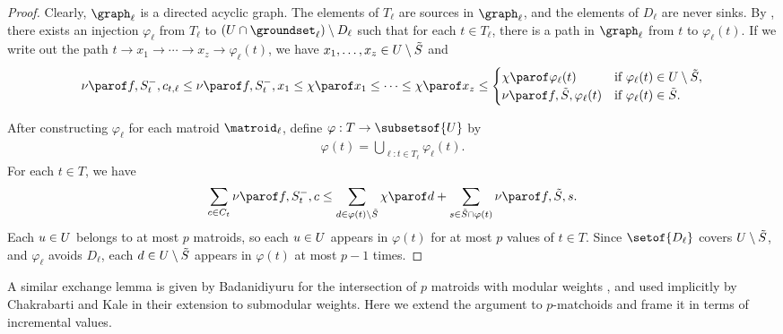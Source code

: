 \documentclass[oneside,letterpaper]{scrartcl} \usepackage{macros}
\newcommand{\mindex}{\ell}
\begin{document}
\begin{proof}
  Clearly, $\graph_{\ell}$ is a directed acyclic graph. The elements
  of $T_{\mindex}$ are sources in $\graph_\ell$, and the elements of
  $D_{\mindex}$ are never sinks. By
  , there exists an injection
  $\varphi_{\mindex}$ from $T_{\mindex}$ to $(\takens \cap
  \groundsetI) \setminus D_{\mindex}$ such that for each $t \in
  T_{\mindex}$, there is a path in $\graph_{\mindex}$ from $t$ to
  $\varphi_{\mindex}(t)$. If we write out the path $t \to x_1 \to
  \cdots \to x_{z} \to \varphi_{\mindex}(t)$, we have $x_1,\dots,x_{z}
  \in U \setminus \tilde{S}$ and
  \begin{align*}
    \incvalueof{f}{\setbefore{t}}{c_{t,\mindex}}\leq \incvalueof{f}{\setbefore{t}}{x_1} \leq \exitvalueof{x_1} \leq \cdots \leq \exitvalueof{x_z} \leq \begin{cases}
      \exitvalueof{\varphi_{\ell}(t)} & \text{if } \varphi_{\ell}(t) \in \deleteds, \\
      \incvalueof{f}{\finalset}{\varphi_{\ell}(t)} & \text{if }\varphi_{\ell}(t) \in \finalset.
    \end{cases}
  \end{align*}

  After constructing $\varphi_{\mindex}$ for each matroid $\matroidI$,
  define $\varphi : T \to \subsetsof{\takens}$ by
  \begin{align*}
    \varphi(t) = \bigcup_{\ell: t \in T_{\mindex}}
    \varphi_{\mindex}(t).
  \end{align*}
  For each $t \in T$, we have
  \begin{align*}
    \sum_{c \in \candidatesfor{t}} \incvalueof{f}{\setbefore{t}}{c}\leq \sum_{\deleted \in \varphi(t) \setminus \finalset}
    \exitvalueof{\deleted} + \sum_{s \in \finalset \cap \varphi(t)}
    \incvalueof{f}{\finalset}{s}.
  \end{align*}
  Each $u \in U$ belongs to at most $p$ matroids, so each
  $u \in U$ appears in $\varphi(t)$ for at most $p$ values
  of $t \in T$.  Since $\setof{D_{\mindex}}$ covers $U \setminus \tilde{S}$, and
  $\varphi_{\mindex}$ avoids $D_{\mindex}$, each $d \in
  U \setminus \tilde{S}$ appears in $\varphi(t)$ at most $p - 1$ times.
\end{proof}
\begin{remark}
  A similar exchange lemma is given by Badanidiyuru for the
  intersection of $p$ matroids with modular weights \cite{abv-11}, and
  used implicitly by Chakrabarti and Kale in their extension to
  submodular weights. Here we extend the argument to $p$-matchoids and
  frame it in terms of incremental values.
\end{remark}
\end{document}
